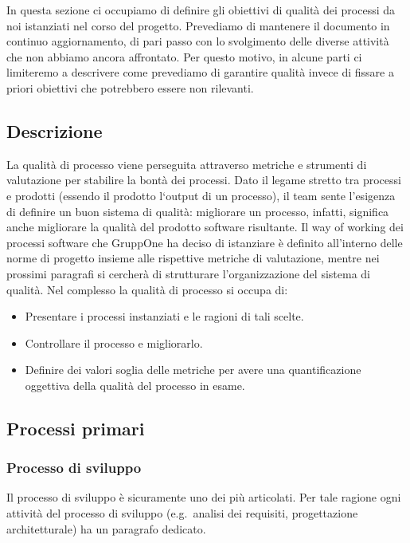 \documentclass[../piano-di-qualifica.tex]{subfiles}
\begin{document}
In questa sezione ci occupiamo di definire gli obiettivi di qualità dei processi da noi istanziati nel corso del progetto.
Prevediamo di mantenere il documento in continuo aggiornamento, di pari passo con lo svolgimento delle diverse attività che non abbiamo ancora affrontato.
Per questo motivo, in alcune parti ci limiteremo a descrivere come prevediamo di garantire qualità invece di fissare a priori obiettivi che potrebbero essere non rilevanti.

\subsection{Descrizione}%
\label{sub:descrizione}

La qualità di processo viene perseguita attraverso metriche e strumenti di valutazione per stabilire la bontà dei processi.
Dato il legame stretto tra processi e prodotti (essendo il prodotto l`output di un processo), il team sente l'esigenza di definire un buon sistema di qualità: migliorare un processo, infatti, significa anche migliorare la qualità del prodotto software risultante.
Il way of working dei processi software che GruppOne ha deciso di istanziare è definito all'interno delle norme di progetto insieme alle rispettive metriche di valutazione, mentre nei prossimi paragrafi si cercherà di strutturare l'organizzazione del sistema di qualità.
Nel complesso la qualità di processo si occupa di:
\begin{itemize}
  \item Presentare i processi instanziati e le ragioni di tali scelte.
  \item Controllare il processo e migliorarlo.
  \item Definire dei valori soglia delle metriche per avere una quantificazione oggettiva della qualità del processo in esame.
\end{itemize}

\subsection{Processi primari}%
\label{sub:processi_primari}

\subsubsection{Processo di sviluppo}%
\label{subs:processo_di_sviluppo}
Il processo di sviluppo è sicuramente uno dei più articolati. Per tale ragione ogni attività del processo di sviluppo (e.g.\ analisi dei requisiti, progettazione architetturale) ha un paragrafo dedicato.
\end{document}
